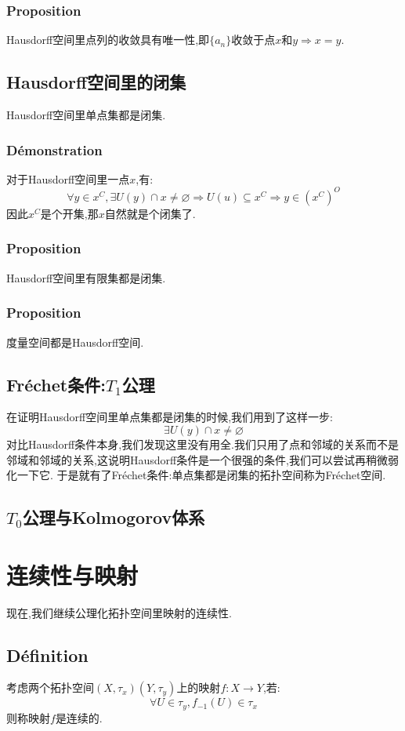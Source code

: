 \documentclass[12pt, a4paper, oneside]{ctexbook}
\begin{document}
  \subsubsection{Proposition}
  Hausdorff空间里点列的收敛具有唯一性,即$\{a_n\}$收敛于点$x$和$y\Rightarrow x=y$.
  \subsection{Hausdorff空间里的闭集}
  Hausdorff空间里单点集都是闭集.
  \subsubsection{Démonstration}
  对于Hausdorff空间里一点$x$,有:
  $$
  \forall y\in x^C, \exists U(y)\cap x\neq\varnothing\Rightarrow U(u)\subseteq x^C\Rightarrow y\in(x^C)^O
  $$因此$x^C$是个开集,那$x$自然就是个闭集了.
  \subsubsection{Proposition}
  Hausdorff空间里有限集都是闭集.
  \subsubsection{Proposition}
  度量空间都是Hausdorff空间.

  \subsection{Fréchet条件:$T_1$公理}
  在证明Hausdorff空间里单点集都是闭集的时候,我们用到了这样一步:
  $$
  \exists U(y)\cap x\neq\varnothing
  $$
  对比Hausdorff条件本身,我们发现这里没有用全.我们只用了点和邻域的关系而不是邻域和邻域的关系,这说明Hausdorff条件是一个很强的条件,我们可以尝试再稍微弱化一下它.
  于是就有了Fréchet条件:单点集都是闭集的拓扑空间称为Fréchet空间.





  \subsection{$T_0$公理与Kolmogorov体系}

\section{连续性与映射}
  现在,我们继续公理化拓扑空间里映射的连续性.
  \subsection{Définition}
  考虑两个拓扑空间$(X,\tau_x)(Y,\tau_y)$上的映射$f:X\rightarrow Y$,若:
  $$
  \forall U\in\tau_y,f_{-1}(U)\in\tau_x
  $$
  则称映射$f$是连续的.
\end{document}
